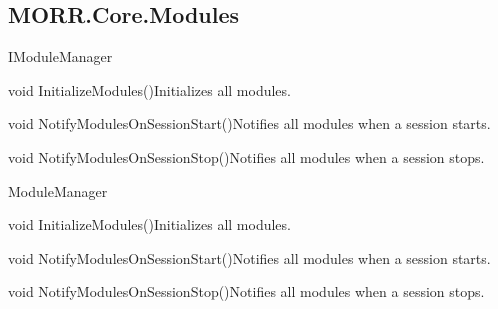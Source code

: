 \subsection*{MORR.Core.Modules}

\begin{interface}{IModuleManager}



    \begin{methods}
        \begin{method}{void InitializeModules()}{Initializes all modules.}      
        \end{method}
        \begin{method}{void NotifyModulesOnSessionStart()}{Notifies all modules when a session starts.}
        \end{method}
        \begin{method}{void NotifyModulesOnSessionStop()}{Notifies all modules when a session stops.}
        \end{method}
    \end{methods}
\end{interface}

\begin{class}{ModuleManager}



    \begin{methods}
        \begin{method}{void InitializeModules()}{Initializes all modules.}      
        \end{method}
        \begin{method}{void NotifyModulesOnSessionStart()}{Notifies all modules when a session starts.}
        \end{method}
        \begin{method}{void NotifyModulesOnSessionStop()}{Notifies all modules when a session stops.}
        \end{method}
    \end{methods}
\end{class}

